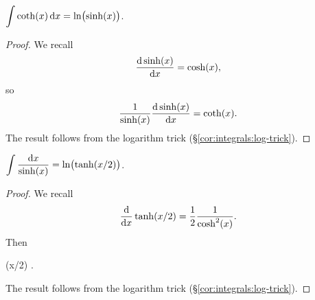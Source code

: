 \M $\displaystyle{\int\coth(x)\,\mathrm{d}x = \ln\bigl(\sinh(x)\bigr)}$.
\begin{proof}
  We recall
  \begin{equation}
\frac{\mathrm{d}\sinh(x)}{\mathrm{d} x}=\cosh(x),
  \end{equation}
  so
  \begin{equation}
\frac{1}{\sinh(x)}\frac{\mathrm{d}\sinh(x)}{\mathrm{d} x}=\coth(x).
  \end{equation}
The result follows from the logarithm trick (\S\ref{cor:integrals:log-trick}).
\end{proof}

\M $\displaystyle{\int\frac{\mathrm{d}x}{\sinh(x)} = \ln\bigl(\tanh(x/2)\bigr)}$.

\begin{proof}
  We recall
\begin{equation}
\frac{\mathrm{d}}{\mathrm{d} x}\tanh(x/2) = \frac{1}{2}\frac{1}{\cosh^{2}(x)}.
\end{equation}
  Then
\begin{calculation}
  \tanh(x/2)
  .
\end{calculation}
The result follows from the logarithm trick (\S\ref{cor:integrals:log-trick}).
\end{proof}

